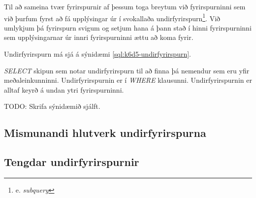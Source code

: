 Til að sameina tvær fyrirspurnir af þessum toga breytum við fyrirspurninni sem við þurfum fyrst að fá upplýsingar úr í svokallaða undirfyrirspurn\footnote{e. \emph{subquery}}. Við umlykjum þá fyrirspurn svigum og setjum hana á þann stað í hinni fyrirspurninni sem upplýsingarnar úr innri fyrirspurninni ættu að koma fyrir.

Undirfyrirspurn má sjá á sýnidæmi \ref{sql:k6d5-undirfyrirspurn}.
\begin{example}
\caption[Undirfyrirspurn]{\emph{SELECT} skipun sem notar undirfyrirspurn til að finna þá nemendur sem eru yfir meðaleinkunninni. Undirfyrirspurnin er í \emph{WHERE} klausunni. Undirfyrirspurnin er alltaf keyrð á undan ytri fyrirspurninni.}
\label{sql:k6d5-undirfyrirspurn}
\centering
{\color{red} TODO: Skrifa sýnidæmið sjálft.}
\end{example}
\subsection{Mismunandi hlutverk undirfyrirspurna}
\subsection{Tengdar undirfyrirspurnir}
